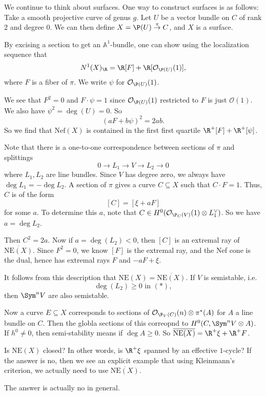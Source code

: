 \documentclass[a4paper]{article}
\newcommand\A{\mathbb{A}}
\newcommand\Nef{\mathrm{Nef}}
\newcommand\NE{\mathrm{NE}}
\begin{document}
\begin{eg}
  We continue to think about surfaces. One way to construct surfaces is as follows: Take a smooth projective curve of genus $g$. Let $U$ be a vector bundle on $C$ of rank $2$ and degree $0$. We can then define $X = \P(U) \overset{\pi}{\to} C$, and $X$ is a surface.

  By excising a section to get an $\A^1$-bundle, one can show using the localization sequence that 
  \[
    N^1(X)_\R = \R[F] + \R[\mathcal{O}_{\P(U)}(1)],
  \]
  where $F$ is a fiber of $\pi$. We write $\psi$ for $\mathcal{O}_{\P(U)}(1)$.

  We see that $F^2 = 0$ and $F \cdot \psi = 1$ since $\mathcal{O}_{\P(U)}(1)$ restricted to $F$ is just $\mathcal{O}(1)$. We also have $\psi^2 = \deg (U) = 0$. So
  \[
    (aF + b\psi)^2 = 2 ab.
  \]
  So we find that $\Nef(X)$ is contained in the first first quartile $\R^+ [F] + \R^+ [\psi]$.

  Note that there is a one-to-one correspondence between sections of $\pi$ and splittings
  \[
    0 \to L_1 \to V \to L_2 \to 0\tag{$*$}
  \]
  where $L_1, L_2$ are line bundles. Since $V$ has degree zero, we always have $\deg L_1 = - \deg L_2$. A section of $\pi$ gives a curve $C \subseteq X$ such that $C \cdot F = 1$. Thus, $C$ is of the form
  \[
    [C] = [\xi + aF]
  \]
  for some $a$. To determine this $a$, note that $C \in H^0(\mathcal{O}_{\P_C(V)}(1) \otimes L_1^\vee)$. So we have $a = \deg L_2$.

  Then $C^2 = 2a$. Now if $a = \deg (L_2) < 0$, then $[C]$ is an extremal ray of $\overline{\NE(X)}$. Since $F^2 = 0$, we know $[F]$ is the extremal ray, and the Nef cone is the dual, hence has extremal rays $F$ and $-aF + \xi$.

  It follows from this description that $\NE(X) = \overline{\NE(X)}$. If $V$ is semistable, i.e.
  \[
    \deg (L_2) \geq 0\text{ in }(*),
  \]
  then $\Sym^n V$ are also semistable. %

  Now a curve $E \subseteq X$ corresponds to sections of $\mathcal{O}_{\P_V(C)} (n) \otimes \pi^*(A)$ for $A$ a line bundle on $C$. Then the globla sections of this correopnd to $H^0(C, \Sym^n V \otimes A)$. If $h^0 \not= 0$, then semi-stability means if $\deg A \geq 0$. So $\overline{\NE(X)} = \R^+ \xi + \R^+ F$.

  Is $\NE(X)$ closed? In other words, is $\R^+ \xi$ spanned by an effective $1$-cycle? If the answer is no, then we see an explicit example that using Kleinmann's criterion, we actually need to use $\overline{\NE(X)}$.

  The answer is actually no in general.
\end{eg}
\end{document}
